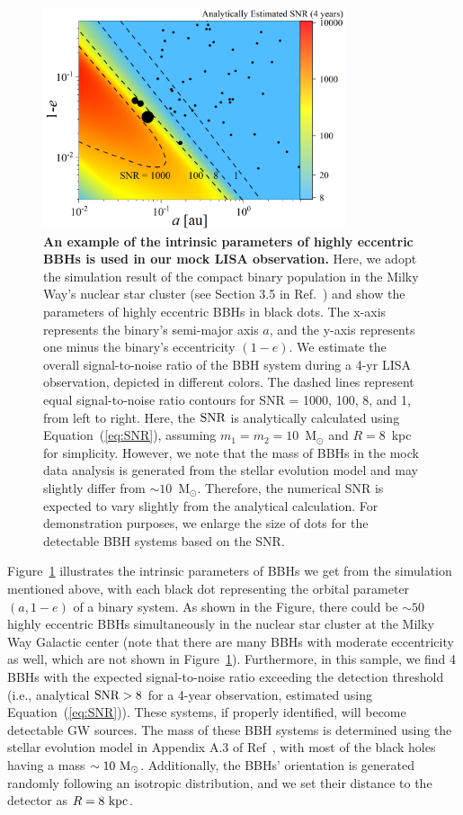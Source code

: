 \documentclass[%
 reprint,
 amsmath,amssymb,
 aps,
]{revtex4-2}
\begin{document}
\begin{figure}[htbp]
    \centering
    \includegraphics[width=3.5in]{sources.png} 
    \caption{{\bf An example of the intrinsic parameters of highly eccentric BBHs is used in our mock LISA observation.} Here, we adopt the simulation result of the compact binary population in the Milky Way's nuclear star cluster (see Section 3.5 in Ref.~\citep[][]{Xuan+23b}) and show the parameters of highly eccentric BBHs in black dots. The x-axis represents the binary's semi-major axis $a$, and the y-axis represents one minus the binary's eccentricity $(1-e)$. We estimate the overall signal-to-noise ratio of the BBH system during a 4-yr LISA observation, depicted in different colors. The dashed lines represent equal signal-to-noise ratio contours for SNR = 1000, 100, 8, and 1, from left to right. Here, the $\rm SNR$ is analytically calculated using Equation~(\ref{eq:SNR}), assuming $m_{1}=m_{2}=10$~M$_{\odot}$ and $R=8$~kpc for simplicity. However, we note that the mass of BBHs in the mock data analysis is generated from the stellar evolution model and may slightly differ from $\sim 10$~M$_{\odot}$. Therefore, the numerical SNR is expected to vary slightly from the analytical calculation.  For demonstration purposes, we enlarge the size of dots for the detectable BBH systems based on the SNR. 
    }
    \label{fig:population}
\end{figure}

Figure~\ref{fig:population} illustrates the intrinsic parameters of BBHs we get from the simulation mentioned above, with each black dot representing the orbital parameter $(a, 1-e)$ of a binary system. As shown in the Figure, there could be $\sim 50$ highly eccentric BBHs simultaneously in the nuclear star cluster at the Milky Way Galactic center (note that there are many BBHs with moderate eccentricity as well, which are not shown in Figure~\ref{fig:population}). Furthermore, in this sample, we find 4 BBHs with the expected signal-to-noise ratio exceeding the detection threshold (i.e., analytical $\rm SNR>8$  for a 4-year observation, estimated using Equation~(\ref{eq:SNR})). These systems, if properly identified, will become detectable GW sources. The mass of these BBH systems is determined using the stellar evolution model in Appendix A.3 of Ref~\citep{Xuan+23b}, with most of the black holes having a mass $\sim 10~{\rm M_{\rm \odot}}$. Additionally, the BBHs' orientation is generated randomly following an isotropic distribution, and we set their distance to the detector as $R=8~\rm kpc$.
\end{document}
